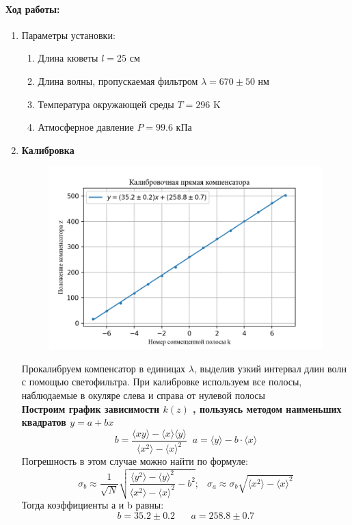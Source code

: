 \documentclass[a4paper,12pt]{article}
\begin{document}
\paragraph{Ход работы:}
\begin{enumerate}
\itemsep0em
\item Параметры установки:
\begin{enumerate}
\itemsep0em
\item Длина кюветы $l = 25$ см
\item Длина волны, пропускаемая фильтром $\lambda = 670 \pm 50 $ нм
\item Температура окружающей среды   $T=296$ K
\item Атмосферное давление $P= 99.6$ кПа
\end{enumerate}
\item \textbf{Калибровка}\\
\begin{figure}[h!]
\includegraphics[scale=0.9]{plot_1.png} 
\end{figure} Прокалибруем компенсатор в единицах $\lambda$, выделив узкий интервал длин волн с помощью светофильтра. При калибровке используем все полосы, наблюдаемые в окуляре слева и справа от нулевой полосы\\
\textbf{Построим график зависимости $k(z)$ , пользуясь методом наименьших квадратов $ y = a + bx $}
\begin{equation}
b = \frac{\langle xy \rangle - \langle x \rangle \langle y \rangle}{\langle x^2 \rangle - \langle x \rangle^2} \;\;
a = \langle y \rangle - b \cdot \langle x \rangle
\label{mnk}
\end{equation}
Погрешность в этом случае можно найти по формуле: 
\begin{equation}
\sigma_b \approx \frac{1}{\sqrt{N}}\sqrt{\frac{\langle y^2 \rangle - \langle y \rangle ^ 2}{\langle x^2 \rangle - \langle x \rangle ^ 2} - b^2} ;\;\;\ \sigma_a \approx \sigma_b\sqrt{\langle x^2 \rangle - \langle x \rangle ^2} 
\end{equation}
Тогда коэффициенты а и b равны: 
\[b = 35.2 \pm 0.2\;\;\;\;\;\; a = 258.8 \pm 0.7\] 


\end{enumerate}
\end{document}
